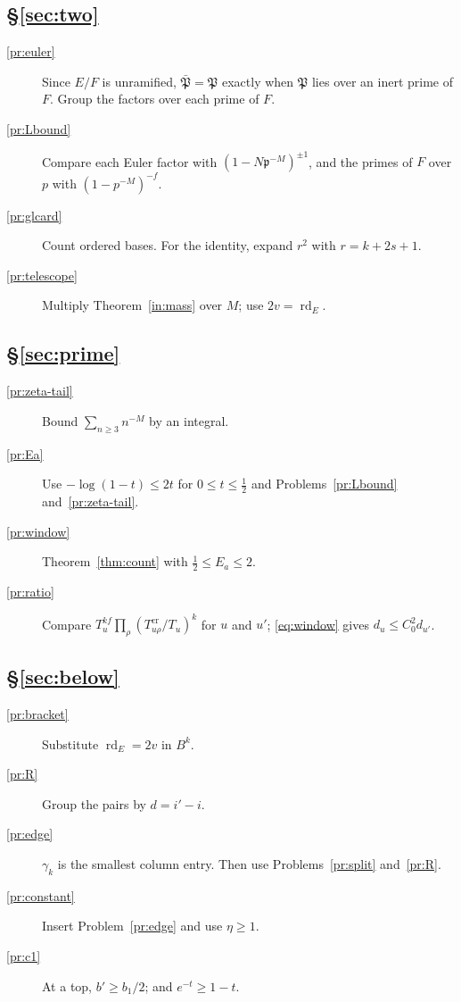 \documentclass[reqno]{amsart}
\theoremstyle{definition}
\theoremstyle{plain}
\theoremstyle{remark}
\newcommand{\rd}{\operatorname{rd}}
\newcommand{\Tc}{T^{\mathrm{cr}}}
\begin{document}
\subsection*{\S\ref{sec:two}}
\begin{description}
\item[\ref{pr:euler}] Since $E/F$ is unramified, $\bar{\mathfrak P}=\mathfrak P$
exactly when $\mathfrak P$ lies over an inert prime of $F$.  Group the
factors over each prime of $F$.
\item[\ref{pr:Lbound}] Compare each Euler factor with
$(1-N\mathfrak p^{-M})^{\pm1}$, and the primes of $F$ over $p$ with
$(1-p^{-M})^{-f}$.
\item[\ref{pr:glcard}] Count ordered bases.  For the identity, expand
$r^2$ with $r=k+2s+1$.
\item[\ref{pr:telescope}] Multiply Theorem~\ref{in:mass} over $M$; use $2v=\rd_E$.
\end{description}
\subsection*{\S\ref{sec:prime}}
\begin{description}
\item[\ref{pr:zeta-tail}] Bound $\sum_{n\ge3}n^{-M}$ by an integral.
\item[\ref{pr:Ea}] Use $-\log(1-t)\le2t$ for $0\le t\le\frac12$ and
Problems~\ref{pr:Lbound} and~\ref{pr:zeta-tail}.
\item[\ref{pr:window}] Theorem~\ref{thm:count} with
$\frac12\le E_a\le2$.
\item[\ref{pr:ratio}] Compare $T_u^{kf}\prod_\rho(\Tc_{u\rho}/T_u)^k$ for $u$ and $u'$;
\eqref{eq:window} gives $d_u\le C_0^2d_{u'}$.
\end{description}
\subsection*{\S\ref{sec:below}}
\begin{description}
\item[\ref{pr:bracket}] Substitute $\rd_E=2v$ in $B^k$.
\item[\ref{pr:R}] Group the pairs by $d=i'-i$.
\item[\ref{pr:edge}] $\gamma_k$ is the smallest column entry.  Then use
Problems~\ref{pr:split} and~\ref{pr:R}.
\item[\ref{pr:constant}] Insert Problem~\ref{pr:edge} and use $\eta\ge1$.
\item[\ref{pr:c1}] At a top, $b'\ge b_1/2$; and $e^{-t}\ge1-t$.
\end{description}
\end{document}
